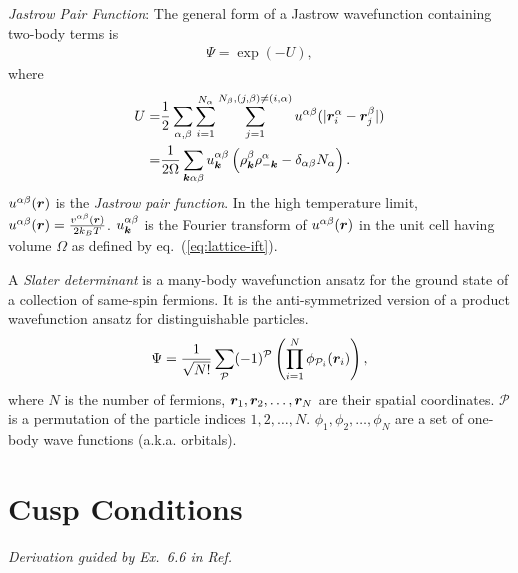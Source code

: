 \begin{definition}\textit{Jastrow Pair Function}:
The general form of a Jastrow wavefunction containing two-body terms is
\begin{align} \label{eq:wf-def-jas}
\Psi = \exp\left(-U\right),
\end{align}
where
\begin{align} \label{eq:wf-def-j2}
U =& \frac{1}{2}\sum\limits_{\alpha, \beta} \sum\limits_{i=1}^{N_\alpha} \sum\limits_{j=1}^{N_\beta, (j,\beta)\neq(i,\alpha)} 
u^{\alpha\beta}(\vert\boldsymbol{r}_i^\alpha - \boldsymbol{r}_j^\beta \vert) \nonumber \\
=& \frac{1}{2\Omega} \sum\limits_{\boldsymbol{k}\alpha\beta}
u^{\alpha\beta}_{\boldsymbol{k}} \left( \rho^\beta_{\boldsymbol{k}}\rho^\alpha_{-\boldsymbol{k}}-\delta_{\alpha\beta}N_\alpha \right).
\end{align}
$u^{\alpha\beta}(\boldsymbol{r})$ is the \emph{Jastrow pair function}. In the high temperature limit, $u^{\alpha\beta}(\boldsymbol{r})=\frac{v^{\alpha\beta}(\boldsymbol{r})}{2k_BT}$. $u^{\alpha\beta}_{\boldsymbol{k}}$ is the Fourier transform of $u^{\alpha\beta}(\boldsymbol{r})$ in the unit cell having volume $\Omega$ as defined by eq.~(\ref{eq:lattice-ift}).
\end{definition}

\begin{definition}
A \textit{Slater determinant} is a many-body wavefunction ansatz for the ground state of a collection of same-spin fermions. It is the anti-symmetrized version of a product wavefunction ansatz for distinguishable particles.
\begin{align}
\Psi = \frac{1}{\sqrt{N!}}\sum\limits_{\mathcal{P}} (-1)^{\mathcal{P}} \left( \prod\limits_{i=1}^N \phi_{\mathcal{P}_i}(\boldsymbol{r}_i) \right),\label{eq:det}
\end{align}
where $N$ is the number of fermions, $\boldsymbol{r}_1, \boldsymbol{r}_2, \dots, \boldsymbol{r}_N$ are their spatial coordinates. $\mathcal{P}$ is a permutation of the particle indices $1, 2, \dots, N$. $\phi_1, \phi_2, \dots, \phi_N$ are a set of one-body wave functions (a.k.a. orbitals).
\end{definition}

\section{Cusp Conditions}\label{sec:wf-cusp}
\emph{Derivation guided by Ex.~6.6 in Ref.~\cite{Martin2016}}

